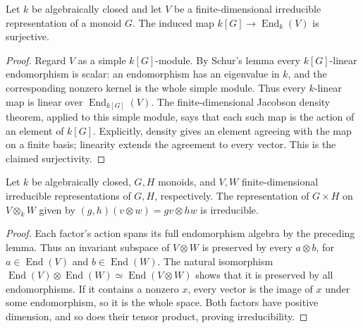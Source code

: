 \begin{lemma}
\label{lem:irreducible-full-endomorphisms}
\leanok
Let $k$ be algebraically closed and let $V$ be a finite-dimensional
irreducible representation of a monoid $G$. The induced map
$k[G]\longrightarrow\operatorname{End}_k(V)$ is surjective.
\end{lemma}
\begin{proof}
Regard $V$ as a simple $k[G]$-module. By Schur's lemma every
$k[G]$-linear endomorphism is scalar: an endomorphism has an
eigenvalue in $k$, and the corresponding nonzero kernel is the whole
simple module. Thus every $k$-linear map is linear over
$\operatorname{End}_{k[G]}(V)$. The finite-dimensional Jacobson density
theorem, applied to this simple module, says that each such map is
the action of an element of $k[G]$. Explicitly, density gives an
element agreeing with the map on a finite basis; linearity extends
the agreement to every vector. This is the claimed surjectivity.
\end{proof}

\begin{lemma}
\label{lem:independent-tensor-irreducible}
\leanok
Let $k$ be algebraically closed, $G,H$ monoids, and $V,W$ finite-dimensional
irreducible representations of $G,H$, respectively. The representation of
$G\times H$ on $V\otimes_k W$ given by
$(g,h)(v\otimes w)=gv\otimes hw$ is irreducible.
\end{lemma}
\begin{proof}
Each factor's action spans its full endomorphism algebra by the preceding
lemma. Thus an invariant subspace of $V\otimes W$ is preserved by every
$a\otimes b$, for $a\in\operatorname{End}(V)$ and
$b\in\operatorname{End}(W)$. The natural isomorphism
$\operatorname{End}(V)\otimes\operatorname{End}(W)
\simeq\operatorname{End}(V\otimes W)$ shows that it is preserved by all
endomorphisms. If it contains a nonzero $x$, every vector is the image of
$x$ under some endomorphism, so it is the whole space. Both factors have
positive dimension, and so does their tensor product, proving irreducibility.
\end{proof}


